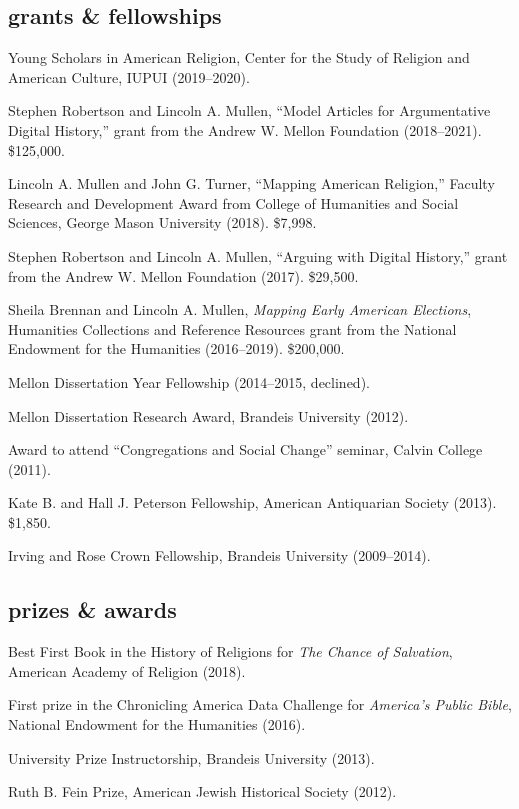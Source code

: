 \documentclass[11pt]{article}
\begin{document}
\subsection{grants \& fellowships}\label{grants-and-fellowships}

Young Scholars in American Religion, Center for the Study of Religion and American Culture, IUPUI (2019--2020).

Stephen Robertson and Lincoln A. Mullen, ``Model Articles for Argumentative Digital History,'' grant from the Andrew W. Mellon Foundation (2018--2021). \$125,000.

Lincoln A. Mullen and John G. Turner, ``Mapping American Religion,'' Faculty Research and Development Award from College of Humanities and Social Sciences, George Mason University (2018). \$7,998.

Stephen Robertson and Lincoln A. Mullen, ``Arguing with Digital History,'' grant from the Andrew W. Mellon Foundation (2017). \$29,500.

Sheila Brennan and Lincoln A. Mullen, \emph{Mapping Early American Elections}, Humanities Collections and Reference Resources grant from the National Endowment for the Humanities (2016--2019). \$200,000.

Mellon Dissertation Year Fellowship (2014--2015, declined).

Mellon Dissertation Research Award, Brandeis University (2012).

Award to attend ``Congregations and Social Change'' seminar, Calvin College 
(2011).

Kate B. and Hall J. Peterson Fellowship, American Antiquarian Society (2013). \$1,850.

Irving and Rose Crown Fellowship, Brandeis University (2009--2014).

\subsection{prizes \& awards}\label{prizes-and-awards}

Best First Book in the History of Religions for \emph{The Chance of Salvation}, American Academy of Religion (2018).

First prize in the Chronicling America Data Challenge for \emph{America's Public Bible}, National Endowment for the Humanities (2016).

University Prize Instructorship, Brandeis University (2013).

Ruth B. Fein Prize, American Jewish Historical Society (2012). 
\end{document}
